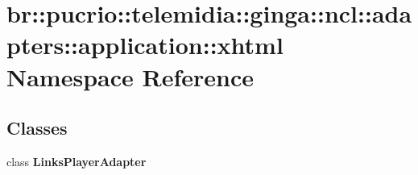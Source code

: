 \section{br::pucrio::telemidia::ginga::ncl::adapters::application::xhtml Namespace Reference}
\label{namespacebr_1_1pucrio_1_1telemidia_1_1ginga_1_1ncl_1_1adapters_1_1application_1_1xhtml}


\subsection*{Classes}
\begin{CompactItemize}
\item 
class {\bf LinksPlayerAdapter}
\end{CompactItemize}
